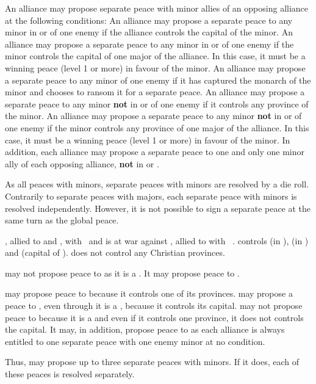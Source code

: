 \label{chPeace:Separate peace minor}
An alliance may propose separate peace with minor allies of an opposing
alliance at the following conditions:
\bparag An alliance may propose a separate peace to any minor in \VASSAL or
\ANNEXION of one enemy if the alliance controls the capital of the minor.
\bparag An alliance may propose a separate peace to any minor in \VASSAL or
\ANNEXION of one enemy if the minor controls the capital of one major of the
alliance. In this case, it must be a winning peace (level 1 or more) in favour
of the minor.
\bparag An alliance may propose a separate peace to any minor of one enemy if
it has captured the monarch of the minor and chooses to ransom it for a
separate peace.
\bparag An alliance may propose a separate peace to any minor \textbf{not} in
\VASSAL or \ANNEXION of one enemy if it controls any province of the minor.
\bparag An alliance may propose a separate peace to any minor \textbf{not} in
\VASSAL or \ANNEXION of one enemy if the minor controls any province of one
major of the alliance. In this case, it must be a winning peace (level 1 or
more) in favour of the minor.
\bparag In addition, each alliance may propose a separate peace to one and
only one minor ally of each opposing alliance, \textbf{not} in \VASSAL or
\ANNEXION.

\bparag As all peaces with minors, separate peaces with minors are resolved by
a die roll.
\bparag Contrarily to separate peaces with majors, each separate peace with
minors is resolved independently.
\bparag However, it is not possible to sign a separate peace at the same turn
as the global peace.

\begin{exemple}
  \TUR, allied to \paysMaroc and \paysTripoli, with \VASSAL\ \paysAlgerie and
  \paysTunisie is at war against \HIS, allied to \paysVenise with \VASSAL\
  \paysChevaliers. \HIS controls \provinceJebelTubqal (in \paysMaroc),
  \provinceOran (in \paysAlgerie) and \provinceIfriqiya (capital of
  \paysTunisie). \TUR does not control any Christian provinces.

  \TUR may not propose peace to \paysChevaliers as it is a \VASSAL. It may
  propose peace to \paysVenise.

  \HIS may propose peace to \paysMaroc because it controls one of its
  provinces. \HIS may propose a peace to \paysTunisie, even through it is a
  \VASSAL, because it controls its capital. \HIS may not propose peace to
  \paysAlgerie because it is a \VASSAL and even if it controls one province,
  it does not controls the capital. It may, in addition, propose peace to
  \paysTripoli as each alliance is always entitled to one separate peace with
  one enemy minor at no condition.

  Thus, \HIS may propose up to three separate peaces with minors. If it does,
  each of these peaces is resolved separately.
\end{exemple}

